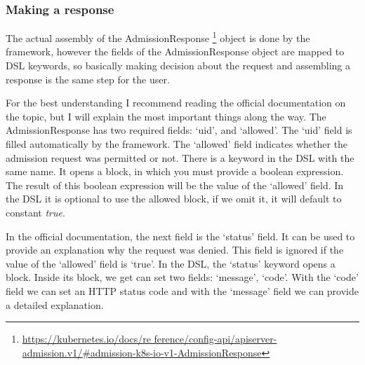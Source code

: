 \subsubsection{Making a response}

The actual assembly of the AdmissionResponse
\footnote{\url{https://kubernetes.io/docs/re  ference/config-api/apiserver-admission.v1/\#admission-k8s-io-v1-AdmissionResponse}}
object is done by the framework, however the fields of the AdmissionResponse object are mapped to DSL keywords, so basically making decision about the request and assembling a response is the same step for the user.

For the best understanding I recommend reading the official documentation on the topic, but I will explain the most important things along the way. The AdmissionResponse has two required fields: `uid', and `allowed'. The `uid' field is filled automatically by the framework. The `allowed' field indicates whether the admission request was permitted or not. There is a keyword in the DSL with the same name. It opens a block, in which you must provide a boolean expression. The result of this boolean expression will be the value of the `allowed' field. In the DSL it is optional to use the allowed block, if we omit it, it will default to constant \emph{true}.

In the official documentation, the next field is the `status' field. It can be used to provide an explanation why the request was denied. This field is ignored if the value of the `allowed' field is `true'. In the DSL, the `status' keyword opens a block. Inside its block, we get can set two fields: `message', `code'. With the `code' field we can set an HTTP status code and with the `message' field we can provide a detailed explanation.



